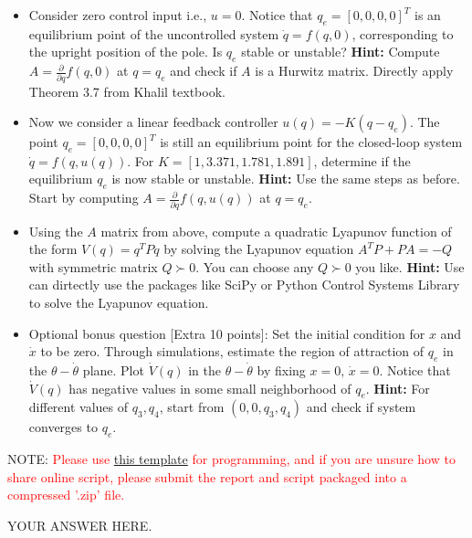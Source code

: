 \begin{problem}[40]
    \begin{itemize}
        \item Consider zero control input i.e., $u=0$. Notice that $q_e=[0,0,0,0]^T$ is an equilibrium point of the uncontrolled system $\dot{q} = f(q,0)$, corresponding to the upright position of the pole. Is $q_e$ stable or unstable? \textbf{Hint:} Compute $A = \frac{\partial}{\partial q} f(q,0)$ at $q = q_e$ and check if $A$ is a Hurwitz matrix. Directly apply Theorem 3.7 from Khalil textbook.
        \item Now we consider a linear feedback controller $u(q)=-K(q-q_e)$. The point $q_e=[0,0,0,0]^T$ is still an equilibrium point for the closed-loop system $\dot{q} = f(q,u(q))$. For $K=[1,3.371, 1.781, 1.891]$, determine if the equilibrium $q_e$ is now stable or unstable. \textbf{Hint:} Use the same steps as before. Start by computing $A = \frac{\partial}{\partial q} f(q,u(q))$ at $q = q_e$.
        \item Using the $A$ matrix from above, compute a quadratic Lyapunov function of the form $V(q) = q^TPq$ by solving the Lyapunov equation $A^TP+PA=-Q$ with symmetric matrix $Q \succ 0$. You can choose any $Q \succ 0$ you like. \textbf{Hint:} Use can dirtectly use the packages like SciPy or Python Control Systems Library to solve the Lyapunov equation.
        \item Optional bonus question [Extra 10 points]: Set the initial condition for $x$ and $\dot{x}$ to be zero. Through simulations, estimate the region of attraction of $q_e$ in the $\theta-\dot{\theta}$ plane. Plot $\dot{V}(q)$ in the $\theta-\dot{\theta}$ by fixing $x=0,\, \dot{x} = 0.$ Notice that $\dot{V}(q)$ has negative values in some small neighborhood of $q_e.$ \textbf{Hint:} For different values of $q_3,q_4$, start from $(0,0,q_3,q_4)$ and check if system converges to $q_e.$
    \end{itemize}

    NOTE: \textcolor{red}{Please use \href{https://colab.research.google.com/drive/1x2WGCb0C48q0tuzGt1kJMdKYDZ4DN0EO?usp=sharing}{this template} for programming, and if you are unsure how to share online script, please submit the report and script packaged into a compressed '.zip' file.}
    
\end{problem}

\begin{answer}
    YOUR ANSWER HERE.
\end{answer}



